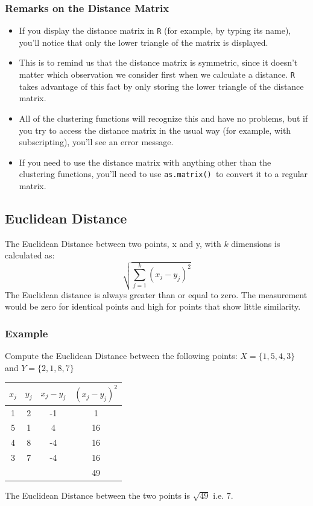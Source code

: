\documentclass[12pt]{article}
\begin{document}
\newpage
\subsubsection*{Remarks on the Distance Matrix}
\begin{itemize}
	\item If you display the distance matrix in \texttt{R} (for example, by typing its name), you'll notice that only the lower triangle of the matrix is displayed. 
	\item This is to remind us that the distance matrix is symmetric, since it doesn't matter which observation we consider first when we calculate a distance. \texttt{R} takes advantage of this fact by only storing the lower triangle of the distance matrix. 
	\item All of the clustering functions will recognize this and have no problems, but if you try to access the distance matrix in the usual way (for example, with subscripting), you'll see an error message. 
	\item If you need to use the distance matrix with anything other than the clustering functions, you'll need to use \texttt{as.matrix() }to convert it to a regular matrix.
\end{itemize}
\newpage
\subsection{Euclidean Distance}
The Euclidean Distance between two points, x and y, with $k$ dimensions is calculated as:
\[ \sqrt{ \sum^{k}_{j=1} ( x_j - y_j)^2 } \]
The Euclidean distance is always greater than or equal to zero. The measurement would be zero for identical points and high for points that show little similarity.

\subsubsection{Example}
Compute the Euclidean Distance between the following points:
$X = \{1,5,4,3\}$ and $Y = \{2,1,8,7\}$

\begin{center}
	\begin{tabular}{|c|c|c|c|}
		\hline
		$x_j$	&	$y_j$	&   $x_j - y_j$	&	$(x_j - y_j)^2$	\\ \hline
		1	&	2	&	-1	&	1	\\
		5	&	1	&	4	&	16	\\
		4	&	8	&	-4	&	16	\\
		3	&	7	&	-4	&	16	\\ \hline
		&		&		&	49	\\ \hline
	\end{tabular}
\end{center}
The Euclidean Distance between the two points is $\sqrt{49}$ i.e. 7.
\end{document}
